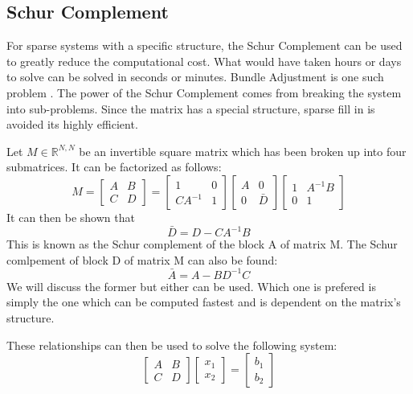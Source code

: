 \documentclass[peerreview,compsoc,onecolumn]{IEEEtran}
\newcommand{\R}{\mathbb{R}}
\begin{document}
\subsection{Schur Complement}
For sparse systems with a specific structure, the Schur Complement can be used to greatly reduce the computational cost. What would have taken hours or days to solve can be solved in seconds or minutes. Bundle Adjustment is one such problem \cite{triggs1999bundle}. The power of the Schur Complement comes from breaking the system into sub-problems. Since the matrix has a special structure, sparse fill in \cite{davis2006} is avoided its highly efficient.

Let $M \in \R^{N,N}$ be an invertible square matrix which has been broken up into four submatrices. It can be factorized as follows:
\begin{equation}
M = \begin{bmatrix}
A & B \\
C & D
\end{bmatrix}
=
\begin{bmatrix}
1 & 0 \\
C A^{-1} & 1
\end{bmatrix}
\begin{bmatrix}
A & 0 \\
0 & \bar{D}
\end{bmatrix}
\begin{bmatrix}
1 & A^{-1}B \\
0 & 1
\end{bmatrix}
\end{equation}
It can then be shown that
\begin{equation}
\bar{D} = D - C A^{-1}B
\end{equation}
This is known as the Schur complement of the block A of matrix M. The Schur comlpement of block D of matrix M can also be found:
\begin{equation}
\bar{A} = A - B D^{-1}C
\end{equation}
We will discuss the former but either can be used. Which one is prefered is simply the one which can be computed fastest and is dependent on the matrix's structure.

These relationships can then be used to solve the following system:
\begin{equation}
\begin{bmatrix}
A & B \\
C & D
\end{bmatrix}
\begin{bmatrix}
x_1 \\ x_2
\end{bmatrix}
=
\begin{bmatrix}
b_1 \\ b_2
\end{bmatrix}
\end{equation}
\end{document}
